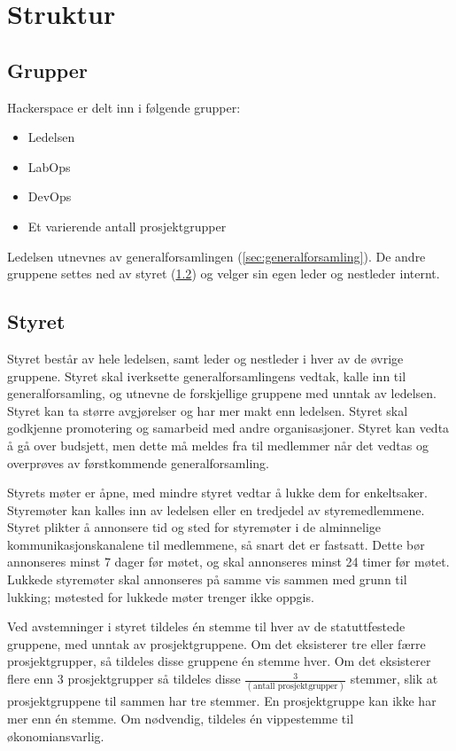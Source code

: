\section{Struktur}\label{sec:struktur}
\subsection{Grupper}\label{sec:struktur:grupper}
Hackerspace er delt inn i følgende grupper:
\begin{itemize}
\item Ledelsen
\item LabOps
\item DevOps
\item Et varierende antall prosjektgrupper
\end{itemize}
Ledelsen utnevnes av generalforsamlingen (\ref{sec:generalforsamling}). De andre gruppene settes ned av styret (\ref{sec:struktur:styret}) og velger sin egen leder og nestleder internt.

\subsection{Styret}\label{sec:struktur:styret}
Styret består av hele ledelsen, samt leder og nestleder i hver av de øvrige gruppene.
Styret skal iverksette generalforsamlingens vedtak, kalle inn til generalforsamling, og utnevne de forskjellige gruppene med unntak av ledelsen.
Styret kan ta større avgjørelser og har mer makt enn ledelsen.
Styret skal godkjenne promotering og samarbeid med andre organisasjoner.
Styret kan vedta å gå over budsjett, men dette må meldes fra til medlemmer når det vedtas og overprøves av førstkommende generalforsamling.

Styrets møter er åpne, med mindre styret vedtar å lukke dem for enkeltsaker.
Styremøter kan kalles inn av ledelsen eller en tredjedel av styremedlemmene.
Styret plikter å annonsere tid og sted for styremøter i de alminnelige kommunikasjonskanalene til medlemmene, så snart det er fastsatt.
Dette bør annonseres minst 7 dager før møtet, og skal annonseres minst 24 timer før møtet.
Lukkede styremøter skal annonseres på samme vis sammen med grunn til lukking; møtested for lukkede møter trenger ikke oppgis.

Ved avstemninger i styret tildeles én stemme til hver av de statuttfestede gruppene, med unntak av prosjektgruppene. 
Om det eksisterer tre eller færre prosjektgrupper, så tildeles disse gruppene én stemme hver. Om det eksisterer flere enn 3 prosjektgrupper så tildeles disse $\frac{3}{(\text{antall prosjektgrupper})}$ stemmer, slik at prosjektgruppene til sammen har tre stemmer. En prosjektgruppe kan ikke har mer enn én stemme.
Om nødvendig, tildeles én vippestemme til økonomiansvarlig.

